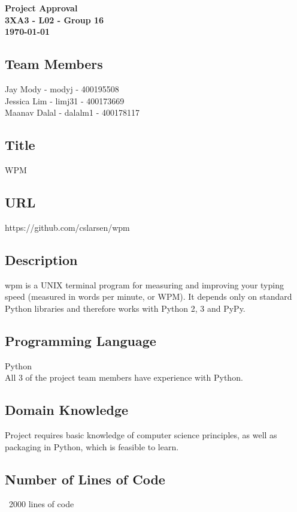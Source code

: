 \documentclass{article}
\begin{document}
\begin{center}
    {\huge \textbf{Project Approval}}\\[2mm]
    {\large \textbf{3XA3 - L02 - Group 16}}\\[2mm]
    {\large \textbf{\today}}\\[2mm]
\end{center}
\medskip

\subsection*{Team Members}

Jay Mody - modyj - 400195508\\
Jessica Lim - limj31 - 400173669\\
Maanav Dalal - dalalm1 - 400178117

\subsection*{Title}
WPM

\subsection*{URL}
https://github.com/cslarsen/wpm

\subsection*{Description}
wpm is a UNIX terminal program for measuring and improving your typing speed (measured in words per minute, or WPM).
It depends only on standard Python libraries and therefore works with Python 2, 3 and PyPy.

\subsection*{Programming Language}
Python\\
All 3 of the project team members have experience with Python.

\subsection*{Domain Knowledge}
Project requires basic knowledge of computer science principles, as well as packaging in Python, which is feasible to learn.

\subsection*{Number of Lines of Code}
~2000 lines of code
\end{document}
